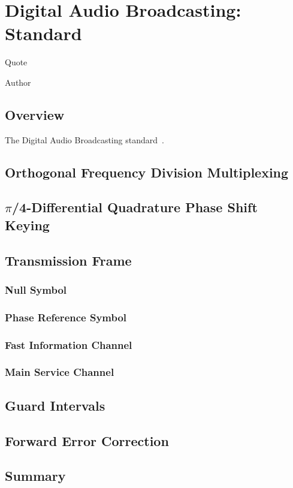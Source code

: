 \documentclass[class=report,11pt,crop=false]{standalone}
\begin{document}
\chapter{Digital Audio Broadcasting: Standard}
\epigraph{Quote}%
{Author}

\section{Overview}
The Digital Audio Broadcasting standard~\cite{dabstandard}.

\blindtext

\section{Orthogonal Frequency Division Multiplexing}
\blindtext

\section{\texorpdfstring{$\pi$}//4-Differential Quadrature Phase Shift Keying}
\blindtext

\section{Transmission Frame}
\blindtext

\subsection{Null Symbol}
\blindtext

\subsection{Phase Reference Symbol}
\blindtext

\subsection{Fast Information Channel}
\blindtext

\subsection{Main Service Channel}
\blindtext

\section{Guard Intervals}
\blindtext

\section{Forward Error Correction}
\blindtext

\section{Summary}
\blindtext

\ifstandalone

\printnoidxglossary[type=\acronymtype]
\fi
\end{document}
